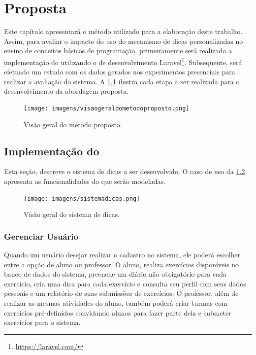 \chapter{Proposta}
Este capítulo apresentará o método utilizado para a elaboração deste trabalho. Assim, para avaliar o impacto do uso do mecanismo de dicas personalizadas no ensino de conceitos básicos de programação, primeiramente será realizado a implementação do  utilizando o  de desenvolvimento Laravel\footnote{\url{https://laravel.com/}}. Subsequente, será efetuado um estudo com os dados gerados nos experimentos presenciais para realizar a avaliação do sistema. A \cref{figura:visaometodo} ilustra cada etapa a ser realizada para o desenvolvimento da abordagem proposta.

\begin{figure}[ht]
	\captionsetup{justification=centering}
	\texttt{[image: imagens/visaogeraldometodoproposto.png]}
	\caption{Visão geral do método proposto.}
	\label{figura:visaometodo}
\end{figure}

\section{Implementação do }

Esta seção, descreve o sistema de dicas a ser desenvolvido. O caso de uso da \cref{figura:sistemadicas} apresenta as funcionalidades do  que serão modeladas.

\begin{figure}[ht]
	\centering
	\captionsetup{justification=centering}
	\texttt{[image: imagens/sistemadicas.png]}
	\caption{Visão geral do sistema de dicas.}
	\label{figura:sistemadicas}
\end{figure}

\subsection{Gerenciar Usuário}

Quando um usuário desejar realizar o cadastro no sistema, ele poderá escolher entre a opção de aluno ou professor. O aluno, realiza exercícios disponíveis no banco de dados do sistema, preenche um diário não obrigatório para cada exercício, cria uma dica para cada exercício e consulta seu perfil com seus dados pessoais e um relatório de suas submissões de exercícios. O professor, além de realizar as mesmas atividades do aluno, também poderá criar turmas com exercícios pré-definidos convidando alunos para fazer parte dela e submeter exercícios para o sistema. 

